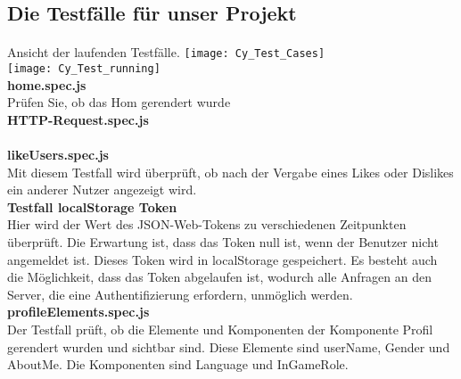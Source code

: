 \subsection{Die Testfälle für unser Projekt}
\paragraph{}
Ansicht der laufenden Testfälle.
\texttt{[image: Cy\_Test\_Cases]}
\\
\texttt{[image: Cy\_Test\_running]}
\\
\textbf{home.spec.js}\\
Prüfen Sie, ob das Hom gerendert wurde
\\
\textbf{HTTP-Request.spec.js}\\
\\
\textbf{likeUsers.spec.js}\\
Mit diesem Testfall wird überprüft, ob nach der Vergabe eines Likes oder Dislikes ein anderer Nutzer angezeigt wird.
\\
\textbf{Testfall localStorage Token}\\
Hier wird der Wert des JSON-Web-Tokens zu verschiedenen Zeitpunkten überprüft.
Die Erwartung ist, dass das Token null ist, wenn der Benutzer nicht angemeldet ist.
Dieses Token wird in localStorage gespeichert.
Es besteht auch die Möglichkeit, dass das Token abgelaufen ist, wodurch alle Anfragen an den Server, die eine Authentifizierung erfordern, unmöglich werden.
\\
\textbf{profileElements.spec.js}\\
Der Testfall prüft, ob die Elemente und Komponenten der Komponente Profil gerendert wurden und sichtbar sind. Diese Elemente sind userName, Gender und AboutMe. Die Komponenten sind Language und InGameRole.

